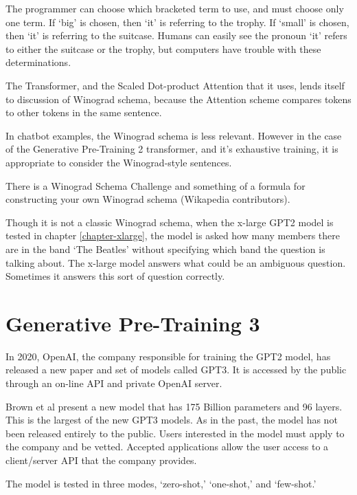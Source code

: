 The programmer can choose which bracketed term to use, and must choose only one term. If `big' is chosen, then `it' is referring to the trophy. If `small' is chosen, then `it' is referring to the suitcase. Humans can easily see the pronoun `it' refers to either the suitcase or the trophy, but computers have trouble with these determinations.

The Transformer, and the Scaled Dot-product Attention that it uses, lends itself to discussion of Winograd schema, because the Attention scheme compares tokens to other tokens in the same sentence. 

In chatbot examples, the Winograd schema is less relevant. %
However in the case of the Generative Pre-Training 2 transformer, and it's exhaustive training, it is appropriate to consider the Winograd-style sentences.

There is a Winograd Schema Challenge and something of a formula for constructing your own Winograd schema (Wikapedia contributors). \cite{wiki:xxx}

Though it is not a classic Winograd schema, when the x-large GPT2 model is tested in chapter \ref{chapter-xlarge}, the model is asked how many members there are in the band `The Beatles' without specifying which band the question is talking about. The x-large model answers what could be an ambiguous question. Sometimes it answers this sort of question correctly.

\section{Generative Pre-Training 3}

\label{discussion-gpt3}

In 2020, OpenAI, the company responsible for training the GPT2 model, has released a new paper and set of models called GPT3. It is accessed by the public through an on-line API and private OpenAI server.

Brown et al \cite{brown2020language} present a new model that has 175 Billion parameters and 96 layers. This is the largest of the new GPT3 models. As in the past, the model has not been released entirely to the public. Users interested in the model must apply to the company and be vetted. Accepted applications allow the user access to a client/server API that the company provides.

The model is tested in three modes, `zero-shot,' `one-shot,' and `few-shot.' 

